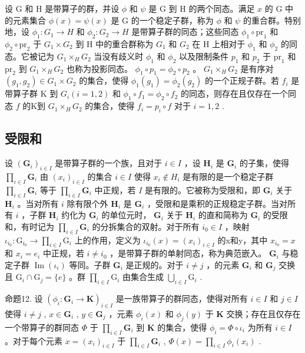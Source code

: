 设 G 和 H 是带算子的群，并设 \(\phi\) 和 \(\psi\) 是 G 到 H 的两个同态。满足 \(x\) 的 G 中的元素集合 \(\phi(x) = \psi(x)\) 是 G 的一个稳定子群，称为 \(\phi\) 和 \(\psi\) 的重合群。特别地，设 \(\phi_1: G_1 \to H\) 和 \(\phi_2: G_2 \to H\) 是带算子群的同态；这些同态 \(\phi_1 \circ \mathrm{pr}_1\) 和 \(\phi_2 \circ \mathrm{pr}_2\) 于 \(G_1 \times G_2\) 到 H 中的重合群称为 \(G_1\) 和 \(G_2\) 在 H 上相对于 \(\phi_1\) 和 \(\phi_2\) 的同态。它被记为 \(G_1 \times_H G_2\) 当没有歧义时 \(\phi_1\) 和 \(\phi_2\) 以及限制条件 \(p_1\) 和 \(p_2\) 于 \(\mathrm{pr}_1\) 和 \(\mathrm{pr}_2\) 到 \(G_1 \times_H G_2\) 也称为投影同态。 \(\phi_1 \circ p_1 = \phi_2 \circ p_2\) 。 \(G_1 \times_H G_2\) 是有序对 \((g_1, g_2) \in G_1 \times G_2\) 的集合，使得 \(\phi_1(g_1) = \phi_2(g_2)\) 的一个正规子群。若 \(f_i\) 是带算子群 K 到 \(G_i (i = 1, 2)\) 和 \(\phi_1 \circ f_1 = \phi_2 \circ f_2\) 的同态，则存在且仅存在一个同态 \(f\) 的K到 \(G_1 \times_H G_2\) 的集合，使得 \(f_i = p_i \circ f\) 对于 \(i = 1, 2\) .

\subsection{受限和}

设 \((\mathbf{G}_i)_{i\in I}\) 是带算子群的一个族，且对于 \(i\in I\) ，设 \(\mathbf{H}_i\) 是 \(\mathbf{G}_i\) 的子集，使得 \(\prod_{i\in I}\mathbf{G}_i\) 由 \((x_i)_{i\in I}\) 的集合 \(i\in I\) 使得 \(x_i\notin H_i\) 是有限的是一个稳定子群 \(\prod_{i\in I}\mathbf{G}_i\) 等于 \(\prod_{i\in I}\mathbf{G}_i\) 中正规，若 \(I\) 是有限的。它被称为受限和，即 \(\mathbf{G}_i\) 关于 \(\mathbf{H}_i\) 。当对所有 \(i\) 除有限个外 \(\mathbf{H}_i\) 是 \(\mathbf{G}_i\) ，受限和是乘积的正规稳定子群。当对所有 \(i\) ，子群 \(\mathbf{H}_i\) 约化为 \(\mathbf{G}_i\) 的单位元时， \(\mathbf{G}_i\) 关于 \(\mathbf{H}_i\) 的直和简称为 \(\mathbf{G}_i\) 的受限和，有时记为 \(\prod_{i\in I}\mathbf{G}_i\) 的分拆集合的双射。对于所有 \(i_0\in I\) ，映射 \(\iota_{i_0}:\mathrm{G}_{i_0}\to \prod_{i\in I}\mathrm{G}_i\) 上的作用，定义为 \(\iota_{i_0}(x) = (x_i)_{i\in I}\) 的x和y，其中 \(x_{i_0} = x\) 和 \(x_i = e_i\) 中正规，若 \(i\neq i_0\) ，是带算子群的单射同态，称为典范嵌入。 \(\mathbf{G}_i\) 与稳定子群 \(\operatorname {Im}(\iota_i)\) 等同。子群 \(\mathbf{G}_i\) 是正规的。对于 \(i\neq j\) ，的元素 \(\mathbf{G}_i\) 和 \(\mathbf{G}_j\) 交换且 \(\mathrm{G}_i\cap \mathrm{G}_j = \{e\}\) 。群 \(\prod_{i\in I}\mathrm{G}_i\) 由集合生成 \(\bigcup_{i\in I}\mathrm{G}_i\) .

命题12. 设 \((\phi_i: \mathbf{G}_i \to \mathbf{K})_{i \in I}\) 是一族带算子的群同态，使得对所有 \(i \in I\) 和 \(j \in I\) 使得 \(i \neq j\) , \(x \in \mathbf{G}_i\) , \(y \in \mathbf{G}_j\) ，元素 \(\phi_i(x)\) 和 \(\phi_j(y)\) 于 \(\mathbf{K}\) 交换；存在且仅存在一个带算子的群同态 \(\Phi\) 于 \(\prod_{i \in I} \mathbf{G}_i\) 到 \(\mathbf{K}\) 的集合，使得 \(\phi_i = \Phi \circ \iota_i\) 为所有 \(i \in I\) 。对于每个元素 \(x = (x_i)_{i \in I}\) 于 \(\prod_{i \in I} \mathbf{G}_i\) , \(\Phi(x) = \prod_{i \in I} \phi_i(x_i)\) .


